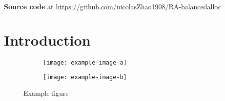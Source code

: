 \documentclass{article}
\title{Assignment 2 - Balanced allocations  \\ \vskip 1em \Large Randomized Algorithms}
\author[*]{Nicolás Zhao}
\affil[*]{Universitat Politècnica de Catalunya (UPC)}
\affil[*]{\textit {nicolas.zhao@estudiantat.upc.edu}}
\date{\today}
\begin{document}
\maketitle

\begin{center}
  \textbf{Source code} at \url{https://github.com/nicolasZhao1908/RA-balancedalloc}
\end{center}

\section{Introduction}

\begin{figure}[htbp]
  \centering
  \begin{subfigure}{0.4\textwidth}
    \centering
    \texttt{[image: example-image-a]}
  \end{subfigure}
  \begin{subfigure}{0.4\textwidth}
    \centering
    \texttt{[image: example-image-b]}
  \end{subfigure}
  \caption{Example figure}
  \label{fig:example}
\end{figure}
\end{document}
